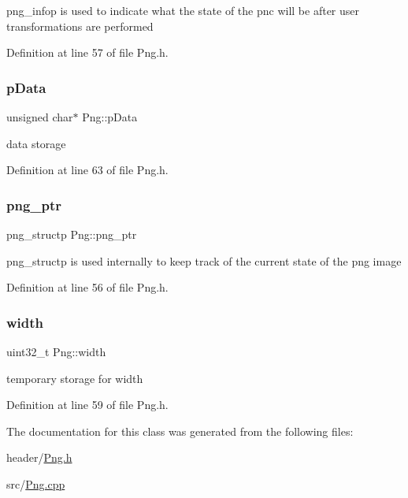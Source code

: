 png\+\_\+infop is used to indicate what the state of the pnc will be after user transformations are performed 

Definition at line 57 of file Png.\+h.

\mbox{\label{classPng_a7d98b75596a172d31599b3e1102210ab}} 
\subsubsection{\texorpdfstring{pData}{pData}}
{\footnotesize\ttfamily unsigned char$\ast$ Png\+::p\+Data\hspace{0.3cm}{\ttfamily [private]}}

data storage 

Definition at line 63 of file Png.\+h.

\mbox{\label{classPng_acbf8ea4c3185452d8620432e5fbd3e38}} 
\subsubsection{\texorpdfstring{png\_ptr}{png\_ptr}}
{\footnotesize\ttfamily png\+\_\+structp Png\+::png\+\_\+ptr\hspace{0.3cm}{\ttfamily [private]}}

png\+\_\+structp is used internally to keep track of the current state of the png image 

Definition at line 56 of file Png.\+h.

\mbox{\label{classPng_a30b6c073e17f2f0cde3eca9e31036f3c}} 
\subsubsection{\texorpdfstring{width}{width}}
{\footnotesize\ttfamily uint32\+\_\+t Png\+::width\hspace{0.3cm}{\ttfamily [private]}}

temporary storage for width 

Definition at line 59 of file Png.\+h.



The documentation for this class was generated from the following files\+:\begin{DoxyCompactItemize}
\item 
header/\mbox{\hyperlink{Png_8h}{Png.\+h}}\item 
src/\mbox{\hyperlink{Png_8cpp}{Png.\+cpp}}\end{DoxyCompactItemize}
